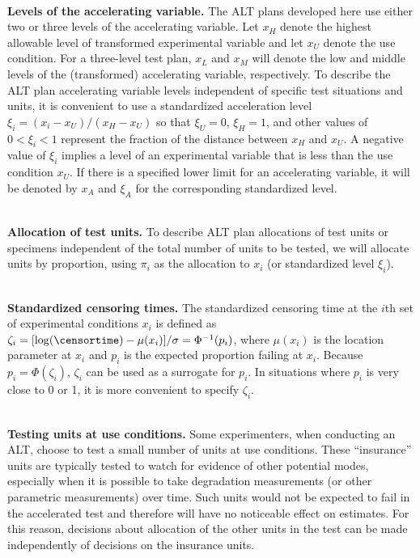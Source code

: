 \mbox{ }\\
\noindent
{\bf Levels of the accelerating variable.} The ALT plans developed
here use either two or three levels of the accelerating
variable. Let $x_{H}$ denote the highest allowable level of
transformed experimental variable and let $x_{U}$ denote the
use condition.  For a three-level test plan, $x_{L}$ and $x_{M}$ will
denote the low and middle levels of the (transformed) accelerating
variable, respectively.  To describe the ALT plan accelerating
variable levels independent of specific test situations and units,
it is convenient to use a standardized acceleration level $\xi_{i} =
(x_{i}-x_{U})/ (x_{H}-x_{U})$ so that $\xi_{U}=0$, $\xi_{H}=1$, and
other values of $0 < \xi_{i} <1 $ represent the fraction of the
distance between $x_{H}$ and $x_{U}$. A negative value of $\xi_{i}$
implies a level of an experimental variable that is less than the
use condition $x_{U}$.  If there is a specified lower limit for an
accelerating variable, it will be denoted by $x_{A}$
and $\xi_{A}$ for the corresponding standardized level.


\mbox{ }\\
\noindent
{\bf Allocation of test units.} To describe ALT plan allocations of
test units or specimens independent of the total number of units to be
tested, we will allocate units by proportion, using $\pi_{i}$ as the
allocation to $x_{i}$ (or standardized level $\xi_{i}$).

\mbox{ }\\
\noindent
{\bf Standardized censoring times.}  The standardized censoring time
at the $i$th set of experimental conditions $x_{i}$ is defined as
$\zeta_{i}= [\log(\censortime)-\mu(x_{i})]/\sigma= \Phi^{-1}(p_{i})$,
where $\mu(x_{i})$ is the location parameter at $x_{i}$ and $p_{i}$
is the expected proportion failing at $x_{i}$. Because $p_{i}=\Phi
(\zeta_{i})$,  $\zeta_{i}$ can be used as a
surrogate for $p_{i}$. In situations where $p_{i}$ is very close to
0 or 1, it is more convenient to specify $\zeta_{i}$.

\mbox{ }\\
\noindent
{\bf Testing units at use conditions.} Some experimenters, when
conducting an ALT, choose to test a small number of units at use
conditions. These ``insurance'' units are typically tested to watch
for evidence of other potential modes, especially when it is
possible to take degradation measurements (or other parametric
measurements) over time. Such units would not be expected to fail in
the accelerated test and therefore will have no noticeable effect on
estimates. For this reason, decisions about allocation of the other
units in the test can be made independently of decisions on the
insurance units.


